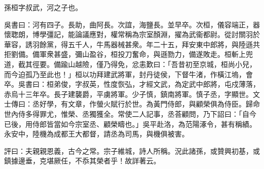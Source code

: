 
\begin{pinyinscope}
孫桓字叔武，河之子也。

吳書曰：河有四子。長助，曲阿長。次誼，海鹽長。並早卒。次桓，儀容端正，器懷聦朗，博學彊記，能論議應對，權常稱為宗室顏淵，擢為武衞都尉。從討關羽於華容，誘羽餘黨，得五千人，牛馬器械甚衆。年二十五，拜安東中郎將，與陸遜共拒劉備。備軍衆甚盛，彌山盈谷，桓投刀奮命，與遜勠力，備遂敗走。桓斬上兜道，截其徑要。備踰山越險，僅乃得免，忿恚歎曰：「吾昔初至京城，桓尚小兒，而今迫孤乃至此也！」桓以功拜建武將軍，封丹徒侯，下督牛渚，作橫江塢，會卒。吳書曰：桓弟俊，字叔英，性度恢弘，才經文武，為定武中郎將，屯戍薄落，赤烏十三年卒。長子建襲爵，平虜將軍。少子慎，鎮南將軍。慎子丞，字顯世。文士傳曰：丞好學，有文章，作螢火賦行於世。為黃門侍郎，與顧榮俱為侍臣。歸命世內侍多得罪尤，惟榮、丞獨獲全。常使二人記事，丞荅顧問，乃下詔曰：「自今已後，用侍郎皆當如今宗室丞、顧榮疇也。」吳平赴洛，為范陽涿令，甚有稱績。永安中，陸機為成都王大都督，請丞為司馬，與機俱被害。

評曰：夫親親恩義，古今之常。宗子維城，詩人所稱。況此諸孫，或贊興初基，或鎮據邊垂，克堪厥任，不忝其榮者乎！故詳著云。


\end{pinyinscope}